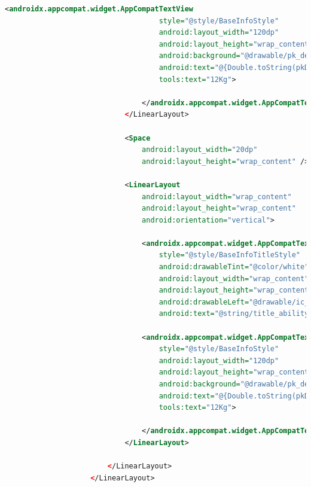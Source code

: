 \documentclass[a4paper, 12pt]{article}
\begin{document}
\begin{lstlisting}[caption={Pokemon Detail Layout.}, label={layout:pk_detail}, language=XML]
                                <androidx.appcompat.widget.AppCompatTextView
                                    style="@style/BaseInfoStyle"
                                    android:layout_width="120dp"
                                    android:layout_height="wrap_content"
                                    android:background="@drawable/pk_detail_general_text"
                                    android:text="@{Double.toString(pkDetail.height)}"
                                    tools:text="12Kg">
    
                                </androidx.appcompat.widget.AppCompatTextView>
                            </LinearLayout>
    
                            <Space
                                android:layout_width="20dp"
                                android:layout_height="wrap_content" />
    
                            <LinearLayout
                                android:layout_width="wrap_content"
                                android:layout_height="wrap_content"
                                android:orientation="vertical">
    
                                <androidx.appcompat.widget.AppCompatTextView
                                    style="@style/BaseInfoTitleStyle"
                                    android:drawableTint="@color/white"
                                    android:layout_width="wrap_content"
                                    android:layout_height="wrap_content"
                                    android:drawableLeft="@drawable/ic_ability"
                                    android:text="@string/title_ability" />
    
                                <androidx.appcompat.widget.AppCompatTextView
                                    style="@style/BaseInfoStyle"
                                    android:layout_width="120dp"
                                    android:layout_height="wrap_content"
                                    android:background="@drawable/pk_detail_general_text"
                                    android:text="@{Double.toString(pkDetail.height)}"
                                    tools:text="12Kg">
    
                                </androidx.appcompat.widget.AppCompatTextView>
                            </LinearLayout>
    
                        </LinearLayout>
                    </LinearLayout>
    

\end{lstlisting}
\end{document}
